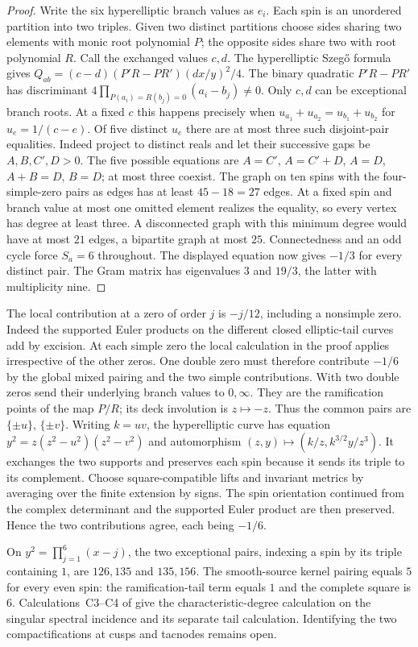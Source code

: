 \begin{proof}
Write the six hyperelliptic branch values as \(e_i\). Each spin is an unordered partition into two triples. Given two distinct partitions choose sides sharing two elements with monic root polynomial \(P\); the opposite sides share two with root polynomial \(R\). Call the exchanged values \(c,d\). The hyperelliptic Szeg\H o formula \cite[Appendix~C, (C.3)--(C.4)]{dhs} gives \(Q_{ab}=(c-d)(P'R-PR')(dx/y)^2/4\). The binary quadratic \(P'R-PR'\) has discriminant \(4\prod_{P(a_i)=R(b_j)=0}(a_i-b_j)\ne0\). Only \(c,d\) can be exceptional branch roots. At a fixed \(c\) this happens precisely when \(u_{a_1}+u_{a_2}=u_{b_1}+u_{b_2}\) for \(u_e=1/(c-e)\). Of five distinct \(u_e\) there are at most three such disjoint-pair equalities. Indeed project to distinct reals and let their successive gaps be \(A,B,C',D>0\). The five possible equations are \(A=C'\), \(A=C'+D\), \(A=D\), \(A+B=D\), \(B=D\); at most three coexist. The graph on ten spins with the four-simple-zero pairs as edges has at least \(45-18=27\) edges. At a fixed spin and branch value at most one omitted element realizes the equality, so every vertex has degree at least three. A disconnected graph with this minimum degree would have at most \(21\) edges, a bipartite graph at most \(25\). Connectedness and an odd cycle force \(S_a=6\) throughout. The displayed equation now gives \(-1/3\) for every distinct pair. The Gram matrix has eigenvalues \(3\) and \(19/3\), the latter with multiplicity nine.
\end{proof}

The local contribution at a zero of order \(j\) is \(-j/12\), including a nonsimple zero. Indeed the supported Euler products on the different closed elliptic-tail curves add by excision. At each simple zero the local calculation in the proof applies irrespective of the other zeros. One double zero must therefore contribute \(-1/6\) by the global mixed pairing and the two simple contributions. With two double zeros send their underlying branch values to \(0,\infty\). They are the ramification points of the map \(P/R\); its deck involution is \(z\mapsto-z\). Thus the common pairs are \(\{\pm u\}\), \(\{\pm v\}\). Writing \(k=uv\), the hyperelliptic curve has equation \(y^2=z(z^2-u^2)(z^2-v^2)\) and automorphism \((z,y)\mapsto(k/z,k^{3/2}y/z^3)\). It exchanges the two supports and preserves each spin because it sends its triple to its complement. Choose square-compatible lifts and invariant metrics by averaging over the finite extension by signs. The spin orientation continued from the complex determinant and the supported Euler product are then preserved. Hence the two contributions agree, each being \(-1/6\).

On \(y^2=\prod_{j=1}^6(x-j)\), the two exceptional pairs, indexing a spin by its triple containing \(1\), are \(126,135\) and \(135,156\). The smooth-source kernel pairing equals \(5\) for every even spin: the ramification-tail term equals \(1\) and the complete square is \(6\). Calculations~C3--C4 of \cite{WueSupplement} give the characteristic-degree calculation on the singular spectral incidence and its separate tail calculation. Identifying the two compactifications at cusps and tacnodes remains open.
